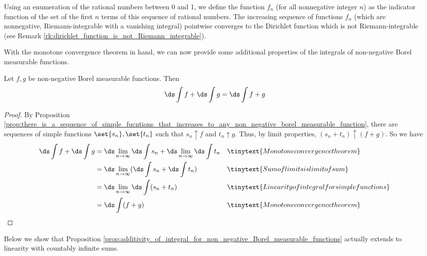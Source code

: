 \documentclass{article} %
\begin{document}
\begin{remark}{}
Using an enumeration of the rational numbers between 0 and 1, we define the function $f_n$ (for all nonnegative integer $n$) as the indicator function of the set of the first $n$ terms of this sequence of rational numbers. The increasing sequence of functions $f_n$ (which are nonnegative, Riemann-integrable with a vanishing integral) pointwise converges to the Dirichlet function which is not Riemann-integrable (see Remark \ref{rk:dirichlet_function_is_not_Riemann_integrable}).
\end{remark}


With the monotone convergence theorem in hand, we can now provide some additional properties of the integrals of non-negative Borel measurable functions.

\begin{proposition}
Let $f, g$ be non-negative Borel measurable functions. Then
\[ \ds\int f + \ds\int g = \ds\int f+g \]
\label{prop:additivity_of_integral_for_non_negative_Borel_measurable_functions}	
\end{proposition}

\begin{proof}
By Proposition \ref{prop:there_is_a_sequence_of_simple_fucntions_that_increases_to_any_non_negative_borel_measurable_function}, there are sequences of simple functions $\set{s_n}, \set{t_n}$ such that $s_n \uparrow f$ and $t_n \uparrow g$.   Thus, by limit properties, $(s_n + t_n) \uparrow (f+g)$.  So we have
\begin{align*}
	\ds\int f + \ds\int g &=\ds\lim_{n \to \infty} \ds\int s_n + \ds\lim_{n \to \infty} \ds\int t_n && \tinytext{Monotone convergence theorem} \\
	&= \ds\lim_{n \to \infty} ( \ds\int s_n +  \ds\int t_n ) && \tinytext{Sum of limits is limit of sum} \\
	&=  \ds\lim_{n \to \infty} \ds\int (s_n + t_n)  && \tinytext{Linearity of integral for simple functions}\\
	&= \ds\int (f+g)  && \tinytext{Monotone convergence theorem}
 \end{align*}
\end{proof}

Below we show that Proposition \ref{prop:additivity_of_integral_for_non_negative_Borel_measurable_functions} actually extends to linearity with countably infinite sums. 
\end{document}
